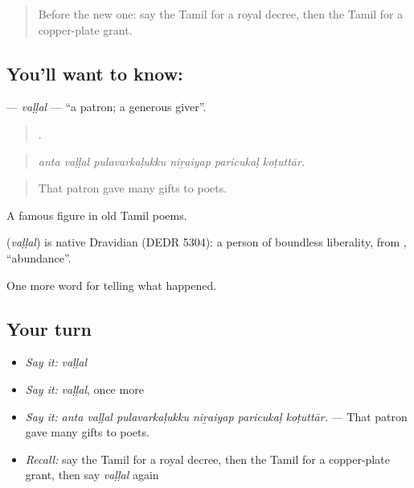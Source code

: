 \label{lesson:TA-C331-vallal}



\begin{quote}
Before the new one: say the Tamil for a royal decree, then the Tamil for a copper-plate grant.
\end{quote}

\subsection*{You'll want to know: }
\textbf{} — \emph{vaḷḷal} — \textquotedblleft{}a patron; a generous giver\textquotedblright{}.

\begin{quote}
     .
\end{quote}

\begin{quote}
\emph{anta vaḷḷal pulavarkaḷukku niṟaiyap paricukaḷ koṭuttār.}
\end{quote}

\begin{quote}
That patron gave many gifts to poets.
\end{quote}

A famous figure in old Tamil poems.

\begin{cousinweb}
\textbf{} (\emph{vaḷḷal}) is native Dravidian (DEDR 5304): a person of boundless liberality, from , \textquotedblleft{}abundance\textquotedblright{}.
\end{cousinweb}

\begin{grammarlens}[title={What you've built}]
One more word for telling what happened.
\end{grammarlens}

\subsection*{Your turn}
\begin{itemize}
\raggedright
  \item \emph{Say it:} \emph{vaḷḷal}
  \item \emph{Say it:} \emph{vaḷḷal}, once more
  \item \emph{Say it:} \emph{anta vaḷḷal pulavarkaḷukku niṟaiyap paricukaḷ koṭuttār.} — That patron gave many gifts to poets.
  \item \emph{Recall:} say the Tamil for a royal decree, then the Tamil for a copper-plate grant, then say \emph{vaḷḷal} again
\end{itemize}

